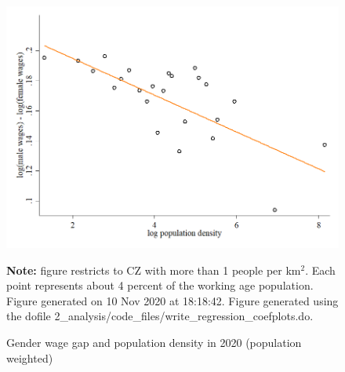 \begin{figure}[!h]
\centering
\caption{Gender wage gap and population density in 2020 (population weighted)}
\includegraphics[width=1\textwidth]{../2_analysis/output/figures/l_czone_density_2020_w}
\par \begin{minipage}[h]{\textwidth}{\tiny\textbf{Note:} figure restricts to CZ with more than 1 people per km$^2$. Each point represents about 4 percent of the working age population. Figure generated on 10 Nov 2020 at 18:18:42. Figure generated using the dofile 2\_analysis/code\_files/write\_regression\_coefplots.do.}\end{minipage}
\end{figure}
